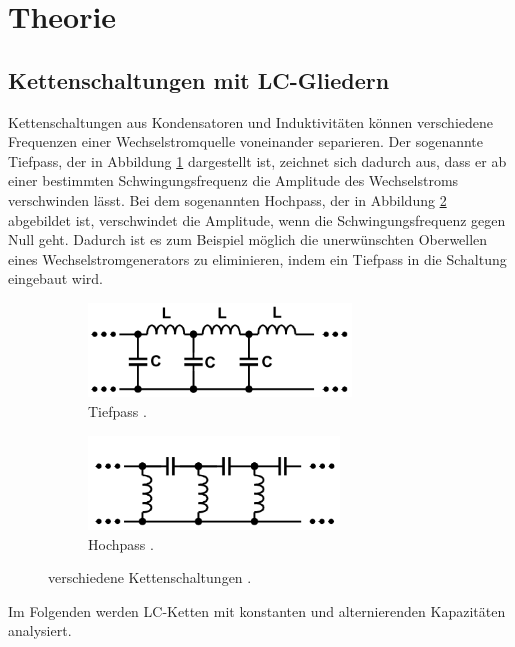 \section{Theorie}
\label{sec:Theorie}

\subsection{Kettenschaltungen mit LC-Gliedern}

Kettenschaltungen aus Kondensatoren und Induktivitäten können verschiedene
Frequenzen einer Wechselstromquelle voneinander separieren.
Der sogenannte Tiefpass, der in Abbildung \ref{subfig:Tiefpass}
dargestellt ist, zeichnet
sich dadurch aus, dass er ab einer bestimmten Schwingungsfrequenz die Amplitude
des Wechselstroms verschwinden lässt.
Bei dem sogenannten Hochpass, der in Abbildung \ref{subfig:Hochpass}
abgebildet ist, verschwindet
die Amplitude, wenn die Schwingungsfrequenz gegen Null geht.
Dadurch ist es zum Beispiel möglich die unerwünschten Oberwellen eines
Wechselstromgenerators zu eliminieren, indem ein Tiefpass in die
Schaltung eingebaut wird.

\begin{figure}
  \centering
  \begin{subfigure}{0.48\textwidth}
    \centering
    \includegraphics[height=2.5cm]{Tiefpass.png}
    \caption{Tiefpass \cite{anleitung}.}
    \label{subfig:Tiefpass}
  \end{subfigure}
  \begin{subfigure}{0.48\textwidth}
    \centering
    \includegraphics[height=2.5cm]{Hochpass.png}
    \caption{Hochpass \cite{anleitung}.}
    \label{subfig:Hochpass}
  \end{subfigure}
  \caption{verschiedene Kettenschaltungen \cite{anleitung}.}
  \label{fig:Ketten}
\end{figure}

Im Folgenden werden LC-Ketten mit konstanten und
alternierenden Kapazitäten analysiert.


